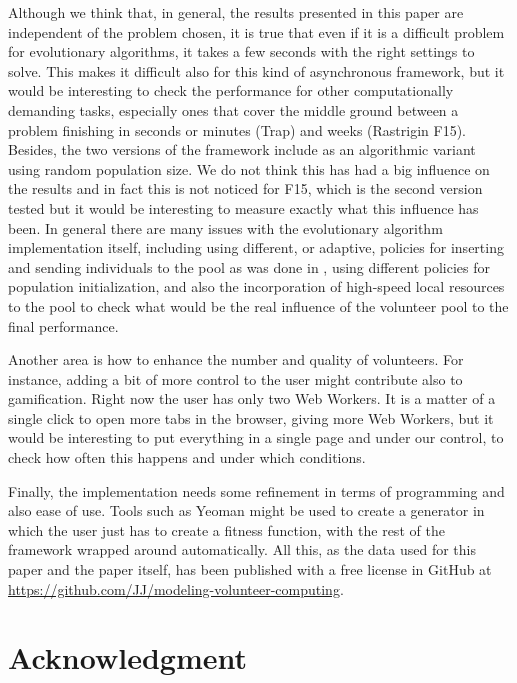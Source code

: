 \documentclass[journal,onecolumn]{IEEEtran}
\begin{document}
Although we think that, in general, the results presented in this
paper are independent of the problem chosen, it is true that even if
it is a difficult problem for evolutionary algorithms, it takes a few
seconds with the right settings to solve. This makes it difficult also
for this kind of asynchronous framework, but it would be interesting
to check the performance for other computationally demanding
tasks, especially ones that cover the middle ground between a problem
finishing in seconds or minutes (Trap) and weeks (Rastrigin F15). 
Besides, the two versions of the framework include as an
algorithmic variant using random population size. We do not think this
has had a big influence on the results and in fact this is not noticed
for F15, which is the second version tested but it would be interesting to
measure exactly what this influence has been. In general there are
many issues with the evolutionary algorithm implementation itself,
including using different, or adaptive, policies for inserting and
sending individuals to the pool as was done in \cite{araujo2008mam},
using different policies for population initialization, and also the
incorporation of high-speed local resources to the pool to check what
would be the real influence of the volunteer pool to the final
performance. 

Another area is how to enhance the number and quality of
volunteers. For instance, adding a bit of more
control to the user might contribute also to gamification. Right now
the user has only two Web Workers. It is a matter of a single click to
open more tabs in the browser, giving more Web Workers, but it would be
interesting to put everything in a single page and under our control,
to check how often this happens and under which conditions. 

Finally, the implementation needs some refinement in terms of
programming and also ease of use. Tools such as Yeoman might be used %
to create a generator in which the user just has to create a fitness
function, with the rest of the framework wrapped around
automatically. All this, as the data used for this paper and the paper
itself, has been published with a free license in GitHub at
\url{https://github.com/JJ/modeling-volunteer-computing}.  

\section*{Acknowledgment}
\end{document}
